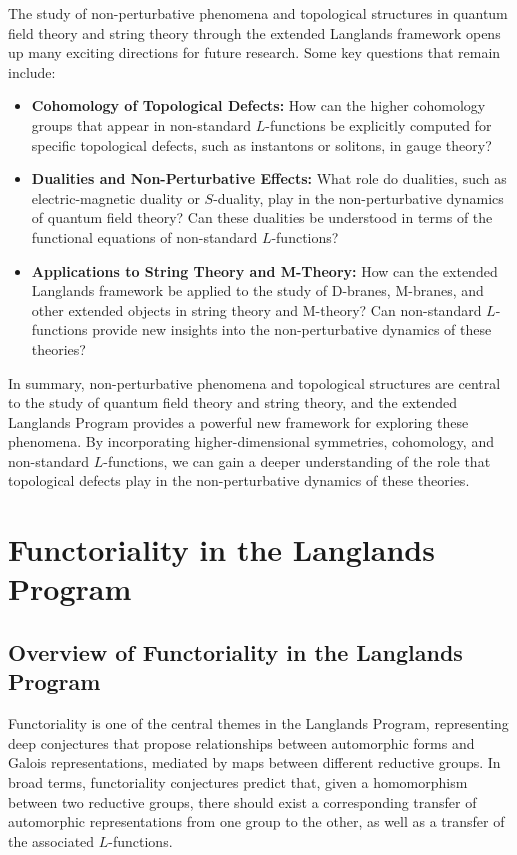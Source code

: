 \documentclass{article}
\theoremstyle{remark}
\begin{document}
The study of non-perturbative phenomena and topological structures in quantum field theory and string theory through the extended Langlands framework opens up many exciting directions for future research. Some key questions that remain include:
\begin{itemize}
    \item \textbf{Cohomology of Topological Defects:} How can the higher cohomology groups that appear in non-standard $L$-functions be explicitly computed for specific topological defects, such as instantons or solitons, in gauge theory?
    \item \textbf{Dualities and Non-Perturbative Effects:} What role do dualities, such as electric-magnetic duality or $S$-duality, play in the non-perturbative dynamics of quantum field theory? Can these dualities be understood in terms of the functional equations of non-standard $L$-functions?
    \item \textbf{Applications to String Theory and M-Theory:} How can the extended Langlands framework be applied to the study of D-branes, M-branes, and other extended objects in string theory and M-theory? Can non-standard $L$-functions provide new insights into the non-perturbative dynamics of these theories?
\end{itemize}

In summary, non-perturbative phenomena and topological structures are central to the study of quantum field theory and string theory, and the extended Langlands Program provides a powerful new framework for exploring these phenomena. By incorporating higher-dimensional symmetries, cohomology, and non-standard $L$-functions, we can gain a deeper understanding of the role that topological defects play in the non-perturbative dynamics of these theories.

\section{Functoriality in the Langlands Program}

\subsection{Overview of Functoriality in the Langlands Program}

Functoriality is one of the central themes in the Langlands Program, representing deep conjectures that propose relationships between automorphic forms and Galois representations, mediated by maps between different reductive groups. In broad terms, functoriality conjectures predict that, given a homomorphism between two reductive groups, there should exist a corresponding transfer of automorphic representations from one group to the other, as well as a transfer of the associated $L$-functions.
\end{document}
